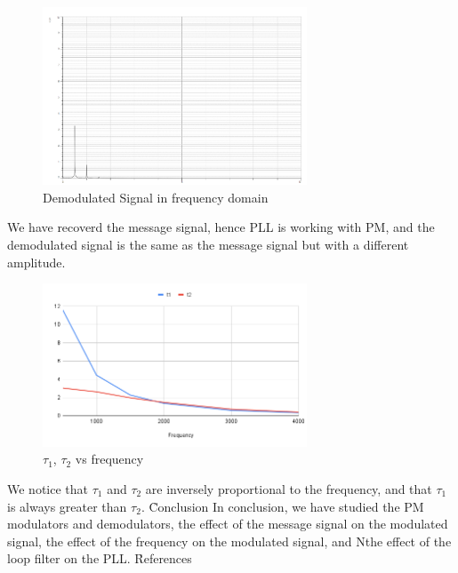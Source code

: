 \documentclass[12pt]{article}
\begin{document}
\begin{figure}[H]
    \centering
    \includegraphics[width=0.7\textwidth]{assets/p6.png}
    \caption{Demodulated Signal in frequency domain}
\end{figure}
We have recoverd the message signal, hence PLL is working with PM, and the demodulated signal is the same as the message signal but with a different amplitude.
\begin{table}[H]
    \caption{$\tau_1$, $\tau_2$ vs frequency}
    \label{tab:my-table}
    \end{table}

\begin{figure}[H]
    \centering
    \includegraphics[width=0.7\textwidth]{assets/chart (16).png}
    \caption{$\tau_1$, $\tau_2$ vs frequency}
\end{figure}
We notice that $\tau_1$ and $\tau_2$ are inversely proportional to the frequency, and that $\tau_1$ is always greater than $\tau_2$.
\h{Conclusion}
In conclusion, we have studied the PM modulators and demodulators, the effect of the message signal on the modulated signal, the effect of the frequency on the modulated signal, and Nthe effect of the loop filter on the PLL.
\clearpage
\h*{References}


\end{document}
